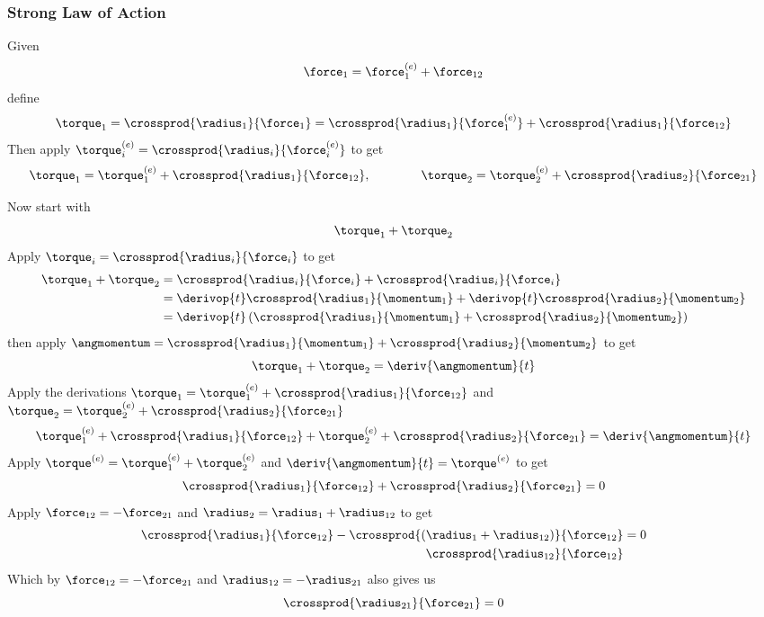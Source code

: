 \subsubsection*{Strong Law of Action}

Given
\[\force_1 = \force^{(e)}_1 + \force_{12}\]
define
\[\torque_1 =
\crossprod{\radius_1}{\force_1} =
\crossprod{\radius_1}{\force^{(e)}_1} + \crossprod{\radius_1}{\force_{12}}\]
Then apply $\torque^{(e)}_i = \crossprod{\radius_i}{\force^{(e)}_i}$ to get
\[
\torque_1 = \torque^{(e)}_1 + \crossprod{\radius_1}{\force_{12}},\qquad\qquad
\torque_2 = \torque^{(e)}_2 + \crossprod{\radius_2}{\force_{21}}
\]

Now start with
\[\torque_1 + \torque_2\]
Apply $\torque_i = \crossprod{\radius_i}{\force_i}$ to get
\begin{align*}
  \torque_1 + \torque_2
  &=
  \crossprod{\radius_i}{\force_i} + \crossprod{\radius_i}{\force_i} \\
  &=
  \derivop{t}\crossprod{\radius_1}{\momentum_1}
  +\derivop{t}\crossprod{\radius_2}{\momentum_2} \\
  &=
  \derivop{t}
  \left(
  \crossprod{\radius_1}{\momentum_1}
  +\crossprod{\radius_2}{\momentum_2}
  \right)
\end{align*}
then apply $\angmomentum = \crossprod{\radius_1}{\momentum_1} +
\crossprod{\radius_2}{\momentum_2}$ to get
\[\torque_1 + \torque_2 = \deriv{\angmomentum}{t}\]
Apply the derivations $\torque_1 = \torque^{(e)}_1 +
\crossprod{\radius_1}{\force_{12}}$ and $\torque_2 = \torque^{(e)}_2 +
\crossprod{\radius_2}{\force_{21}}$
\[
\torque^{(e)}_1
+\crossprod{\radius_1}{\force_{12}}
+\torque^{(e)}_2
+\crossprod{\radius_2}{\force_{21}}
=
\deriv{\angmomentum}{t}
\]
Apply $\torque^{(e)} = \torque^{(e)}_1 + \torque^{(e)}_2$ and $\deriv{\angmomentum}{t} = \torque^{(e)}$ to get
\[
\crossprod{\radius_1}{\force_{12}} + \crossprod{\radius_2}{\force_{21}}
=
0
\]
Apply $\force_{12} = -\force_{21}$ and $\radius_2 = \radius_1 +
\radius_{12}$ to get
\begin{align*}
  \crossprod{\radius_1}{\force_{12}}
  -\crossprod{(\radius_1 + \radius_{12})}{\force_{12}}
  &=
  0 \\
  \crossprod{\radius_{12}}{\force_{12}}
\end{align*}
Which by $\force_{12} = -\force_{21}$ and $\radius_{12} =
-\radius_{21}$ also gives us
\[\crossprod{\radius_{21}}{\force_{21}} = 0\]
